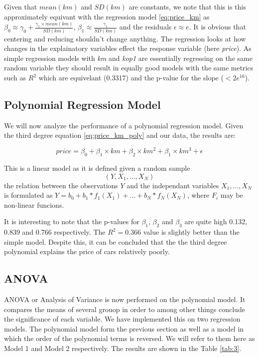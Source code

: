 \noindent
Given that $mean(km)$ and $SD(km)$ are constants, we note that this is this approximately equivant with the regression model \ref{eq:price_km} as $\beta_0 \approx \gamma_0 + \frac{\gamma_1 \times mean(km)}{SD(km)}$, $\beta_1 \approx \frac{\gamma_1}{SD(km)}$ and the residuals $\epsilon \approx e$. It is obvious that centering and reducing shouldn't change anything. The regression looks at how changes in the explainatory variables effect the response variable (here \textit{price}). As simple regression models with \textit{km} and \textit{kop1} are essentially regressing on the same random variable they should result in equally good models with the same metrics such as $R^2$ which are equivelant (0.3317) and the p-value for the slope ($<2e^{16}$).


\subsection{Polynomial Regression Model} %
\label{sub:poly_km}

We will now analyze the performance of a polynomial regression model. Given the third degree equation \ref{eq:price_km_poly} and our data, the results are:

\begin{equation}\label{eq:price_km_poly}
	price = \beta_0 + \beta_1 \times km + \beta_2 \times km^2 + \beta_1 \times km^3 
	+ \epsilon
\end{equation}

\noindent
This is a linear model as it is defined given a random sample $$(Y,X_1,\ldots,X_N)$$ the relation between the observations $Y$ and the independant variables $X_1,\ldots,X_N$ is formulated as $Y = b_0 + b_1*f_1(X_1) + \ldots + b_N*f_N(X_N)$, where $F_i$ may be non-linear funcions.

\noindent
It is interesting to note that the p-values for $\beta_1$, $\beta_2$ and $\beta_3$ are quite high 0.132, 0.839 and 0.766 respectively. The $R^2 = 0.366$ value is slightly better than the simple model. Despite this, it can be concluded that the the third degree polynomial explains the price of cars relatively poorly.

\subsection{ANOVA} %
\label{sub:anova}

ANOVA or Analysis of Variance is now performed on the polynomial model. It compares the means of several grouop in order to among other things conclude the significance of each variable. We have implemented this on two regression models. The polynomial model form the previous section as well as a model in which the order of the polynomial terms is reversed. We will refer to them here as Model 1 and Model 2 respectively. The results are shown in the Table \ref{tab:3}.

